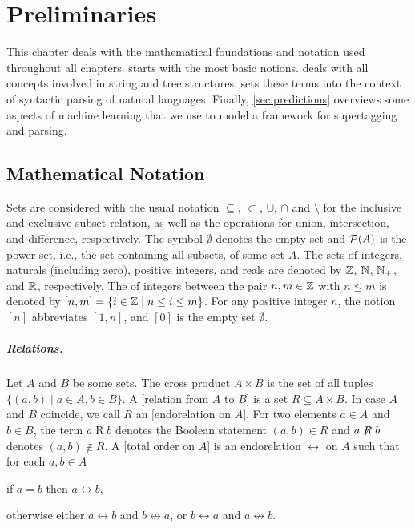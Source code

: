 \documentclass[../document.tex]{subfiles}
\begin{document}
    \chapter{Preliminaries}\label{sec:preliminaries}
    This chapter deals with the mathematical foundations and notation used throughout all chapters.
     starts with the most basic notions.
     deals with all concepts involved in string and tree structures.
     sets these terms into the context of syntactic parsing of natural languages.
    Finally, \cref{sec:predictions} overviews some aspects of machine learning that we use to model a framework for supertagging and parsing.

    \section{Mathematical Notation}\label{sec:preliminaries:math}
    Sets are considered with the usual notation \(\subseteq\), \(\subset\), \(\cup\), \(\cap\) and \(\setminus\) for the inclusive and exclusive subset relation, as well as the operations for union, intersection, and difference, respectively.
    The symbol \(\emptyset\) denotes the empty set and \(\mathcal{P}(A)\) is the power set, i.e., the set containing all subsets, of some set \(A\).
    The sets of integers, naturals (including zero), positive integers, and reals are denoted by $\mathbb{Z}$, $\mathbb{N}$, $\mathbb{N}_+$, and $\mathbb{R}$, respectively.
    The  of integers between the pair \(n, m \in \mathbb{Z}\) with \(n \leq m\) is denoted by \([n,m] = \{i \in \mathbb{Z} \mid n \leq i \leq m\}\).
    For any positive integer \(n\), the notion \([n]\) abbreviates \([1,n]\), and \([0]\) is the empty set \(\emptyset\).

    \paragraph{Relations.}
    Let \(A\) and \(B\) be some sets.
    The cross product \(A \times B\) is the set of all tuples \(\{(a,b) \mid a \in A, b\in B\}\).
    A [relation from \(A\) to \(B\)] is a set \(R \subseteq A \times B\).
    In case \(A\) and \(B\) coincide, we call \(R\) an [endorelation on \(A\)].
    For two elements \(a \in A\) and \(b \in B\), the term \(a \mathrel{R} b\) denotes the Boolean statement \((a,b) \in R\) and \(a \not\mathrel{R} b\) denotes \((a,b) \notin R\).
    A [total order on \(A\)] is an endorelation \(\rel\) on \(A\) such that for each \(a, b \in A\)
    \begin{inparaenum}
        \item if \(a = b\) then \(a \rel b\),
        \item otherwise either \(a \rel b\) and \(b \not\rel a\), or \(b \rel a\) and \(a \not\rel b\).
    \end{inparaenum}
\end{document}
